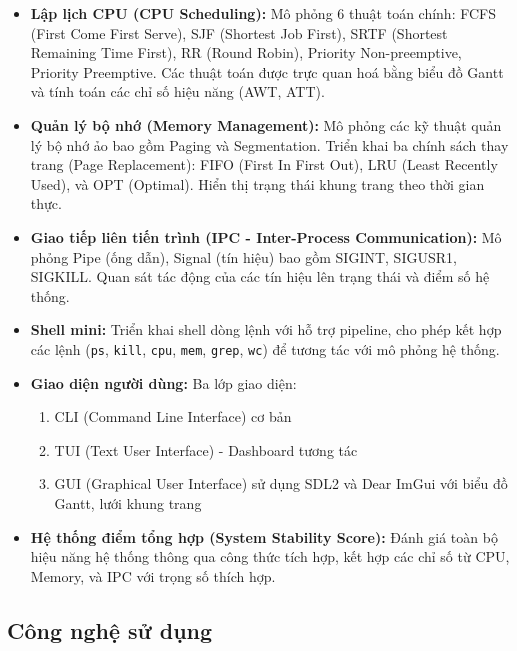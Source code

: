 \begin{itemize}[leftmargin=1.5cm]
  \item \textbf{Lập lịch CPU (CPU Scheduling):} 
  Mô phỏng 6 thuật toán chính: FCFS (First Come First Serve), SJF (Shortest Job First), 
  SRTF (Shortest Remaining Time First), RR (Round Robin), Priority Non-preemptive, Priority Preemptive. 
  Các thuật toán được trực quan hoá bằng biểu đồ Gantt và tính toán các chỉ số hiệu năng (AWT, ATT).

  \item \textbf{Quản lý bộ nhớ (Memory Management):} 
  Mô phỏng các kỹ thuật quản lý bộ nhớ ảo bao gồm Paging và Segmentation. 
  Triển khai ba chính sách thay trang (Page Replacement): FIFO (First In First Out), 
  LRU (Least Recently Used), và OPT (Optimal). Hiển thị trạng thái khung trang theo thời gian thực.

  \item \textbf{Giao tiếp liên tiến trình (IPC - Inter-Process Communication):} 
  Mô phỏng Pipe (ống dẫn), Signal (tín hiệu) bao gồm SIGINT, SIGUSR1, SIGKILL. 
  Quan sát tác động của các tín hiệu lên trạng thái và điểm số hệ thống.

  \item \textbf{Shell mini:} 
  Triển khai shell dòng lệnh với hỗ trợ pipeline, cho phép kết hợp các lệnh 
  (\texttt{ps}, \texttt{kill}, \texttt{cpu}, \texttt{mem}, \texttt{grep}, \texttt{wc}) 
  để tương tác với mô phỏng hệ thống.

  \item \textbf{Giao diện người dùng:} 
  Ba lớp giao diện:
  \begin{enumerate}[nosep]
    \item CLI (Command Line Interface) cơ bản
    \item TUI (Text User Interface) - Dashboard tương tác
    \item GUI (Graphical User Interface) sử dụng SDL2 và Dear ImGui với biểu đồ Gantt, lưới khung trang
  \end{enumerate}

  \item \textbf{Hệ thống điểm tổng hợp (System Stability Score):} 
  Đánh giá toàn bộ hiệu năng hệ thống thông qua công thức tích hợp, kết hợp 
  các chỉ số từ CPU, Memory, và IPC với trọng số thích hợp.
\end{itemize}

\subsection*{Công nghệ sử dụng}

